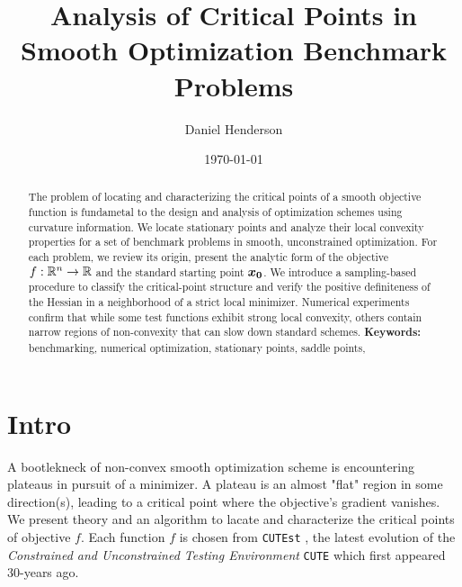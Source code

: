 \documentclass[10pt]{article}
\title{Analysis of Critical Points in Smooth Optimization Benchmark Problems}
\author{Daniel Henderson}
\date{\today}
\begin{document}
\maketitle


\begin{abstract}
    \noindent
    The problem of locating and characterizing the critical points of a
    smooth objective function is fundametal to the design and analysis of
    optimization schemes using curvature information. We locate stationary
    points and analyze their local convexity properties for a set of benchmark
    problems in smooth, unconstrained optimization.
    For each problem, we review its origin, present the analytic form
    of the objective $f:\mathbb{R}^n \to \mathbb{R}$ and the standard starting point
    $\bm{x_0}$.  We introduce a sampling-based procedure to classify
    the critical-point structure and verify the positive definiteness of
    the Hessian in a neighborhood of a strict local minimizer.  Numerical
    experiments confirm that while some test functions exhibit strong
    local convexity, others contain narrow regions of non-convexity that
    can slow down standard schemes.
    \noindent\textbf{Keywords:} benchmarking, numerical optimization, stationary points, saddle points,
\end{abstract}



\tableofcontents

\newpage


\section{Intro}
    \label{sec:intro}
    
    \medskip
    
    A bootlekneck of non-convex smooth optimization scheme is encountering plateaus in 
    pursuit of a minimizer. A plateau is an almost "flat" region in some direction(s),
    leading to a critical point where the objective's gradient vanishes. We present theory
    and an algorithm to lacate and characterize the critical points of objective $f$.
    Each function $f$ is chosen from \texttt{CUTEst} \cite{gould2015cutest}, the 
    latest evolution of the \emph{Constrained and Unconstrained Testing Environment} 
    \texttt{CUTE} \cite{bongartz1995cute} which first appeared $30$-years ago. 
    
\end{document}
